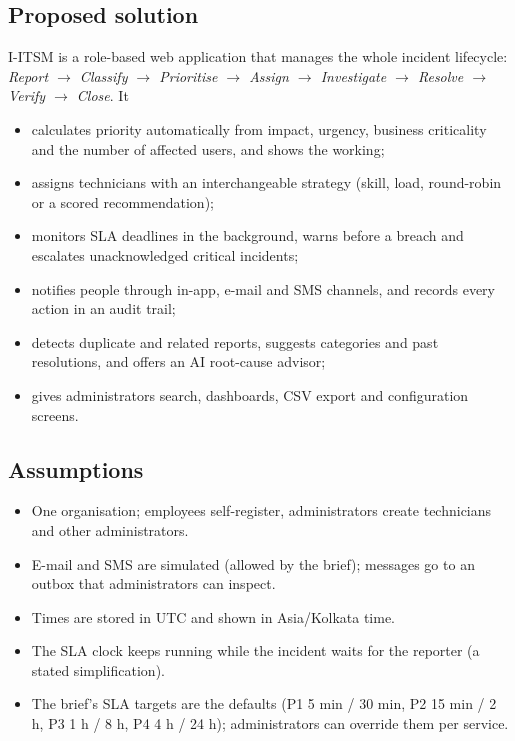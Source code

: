 \documentclass[11pt,a4paper]{article}
\begin{document}
\subsection{Proposed solution}
I-ITSM is a role-based web application that manages the whole incident lifecycle:
\textit{Report $\rightarrow$ Classify $\rightarrow$ Prioritise $\rightarrow$ Assign $\rightarrow$ Investigate $\rightarrow$ Resolve $\rightarrow$ Verify $\rightarrow$ Close}. It
\begin{itemize}
  \item calculates priority automatically from impact, urgency, business criticality and the number of affected users, and shows the working;
  \item assigns technicians with an interchangeable strategy (skill, load, round-robin or a scored recommendation);
  \item monitors SLA deadlines in the background, warns before a breach and escalates unacknowledged critical incidents;
  \item notifies people through in-app, e-mail and SMS channels, and records every action in an audit trail;
  \item detects duplicate and related reports, suggests categories and past resolutions, and offers an AI root-cause advisor;
  \item gives administrators search, dashboards, CSV export and configuration screens.
\end{itemize}

\subsection{Assumptions}
\begin{itemize}
  \item One organisation; employees self-register, administrators create technicians and other administrators.
  \item E-mail and SMS are simulated (allowed by the brief); messages go to an outbox that administrators can inspect.
  \item Times are stored in UTC and shown in Asia/Kolkata time.
  \item The SLA clock keeps running while the incident waits for the reporter (a stated simplification).
  \item The brief's SLA targets are the defaults (P1 5 min / 30 min, P2 15 min / 2 h, P3 1 h / 8 h, P4 4 h / 24 h); administrators can override them per service.
\end{itemize}
\end{document}
